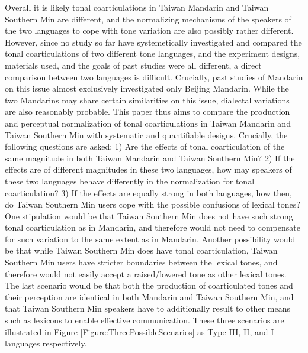 Overall it is likely tonal coarticulations in Taiwan Mandarin and Taiwan Southern Min are different, and the normalizing mechanisms of the speakers of the two languages to cope with tone variation are also possibly rather different. However, since no study so far have systemetically investigated and compared the tonal coarticulations of two different tone languages, and the experiment designs, materials used, and the goals of past studies were all different, a direct comparison between two languages is difficult. Crucially, past studies of Mandarin on this issue almost exclusively investigated only Beijing Mandarin. While the two Mandarins may share certain similarities on this issue, dialectal variations are also reasonably probable. This paper thus aims to compare the production and perceptual normalization of tonal coarticulations in Taiwan Mandarin and Taiwan Southern Min with systematic and quantifiable designs. Crucially, the following questions are asked: 1) Are the effects of tonal coarticulation of the same magnitude in both Taiwan Mandarin and Taiwan Southern Min? 2) If the effects are of different magnitudes in these two languages, how may speakers of these two languages behave differently in the normalization for tonal coarticulation? 3) If the effects are equally strong in both languages, how then, do Taiwan Southern Min users cope with the possible confusions of lexical tones? One stipulation would be that Taiwan Southern Min does not have such strong tonal coarticulation as in Mandarin, and therefore would not need to compensate for such variation to the same extent as in Mandarin. Another possibility would be that while Taiwan Southern Min does have tonal coarticulation, Taiwan Southern Min users have stricter boundaries between the lexical tones, and therefore would not easily accept a raised/lowered tone as other lexical tones. The last scenario would be that both the production of coarticulated tones and their perception are identical in both Mandarin and Taiwan Southern Min, and that Taiwan Southern Min speakers have to additionally result to other means such as lexicons to enable effective communication. These three scenarios are illustrated in Figure \ref{Figure:ThreePossibleScenarios} as Type III, II, and I languages respectively.

